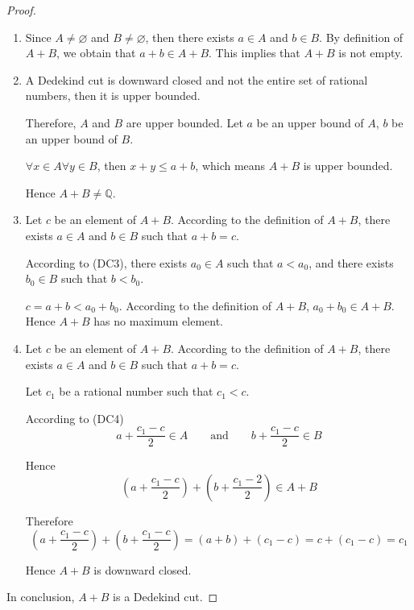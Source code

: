 \documentclass[class=mike-apostol-mathematical-analysis,crop=false]{standalone}
\begin{document}
\begin{proof}
    \begin{enumerate}[label = (\roman*)]
        \item Since $ A\ne\varnothing$ and $ B\ne\varnothing$, then there exists $a\in A$ and $b\in B$. By definition of $ A +  B$, we obtain that $a + b \in  A +  B$. This implies that $ A +  B$ is not empty.
        \item A Dedekind cut is downward closed and not the entire set of rational numbers, then it is upper bounded.
              \par Therefore, $ A$ and $ B$ are upper bounded. Let $a$ be an upper bound of $ A$, $b$ be an upper bound of $ B$.
              \par $\forall x\in A\forall y\in B$, then $x + y \le a + b$, which means $ A +  B$ is upper bounded.
              \par Hence $ A +  B\ne\mathbb{Q}$.
        \item Let $c$ be an element of $ A +  B$. According to the definition of $ A +  B$, there exists $a\in A$ and $b\in B$ such that $a + b = c$.
              \par According to (DC3), there exists $a_{0}\in A$ such that $a < a_{0}$, and there exists $b_{0}\in B$ such that $b < b_{0}$.
              \par $c = a + b < a_{0} + b_{0}$. According to the definition of $ A +  B$, $a_{0} + b_{0} \in  A +  B$. Hence $ A +  B$ has no maximum element.
        \item Let $c$ be an element of $ A +  B$. According to the definition of $ A +  B$, there exists $a\in A$ and $b\in B$ such that $a + b = c$.
              \par Let $c_{1}$ be a rational number such that $c_{1} < c$.
              \par According to (DC4)
              \[
                  a + \frac{c_{1} - c}{2}\in A\qquad\text{and}\qquad b + \frac{c_{1} - c}{2}\in B
              \]
              \par Hence
              \[
                  \left( a + \dfrac{c_{1} - c}{2} \right) + \left( b + \dfrac{c_{1} - 2}{2} \right) \in  A +  B
              \]
              \par Therefore
              \[
                  \left( a + \dfrac{c_{1} - c}{2} \right) + \left( b + \dfrac{c_{1} - c}{2} \right) = (a + b) + (c_{1} - c) = c + (c_{1} - c) = c_{1}
              \]
              \par Hence $ A +  B$ is downward closed.
    \end{enumerate}
    \par In conclusion, $ A +  B$ is a Dedekind cut.
\end{proof}
\end{document}

